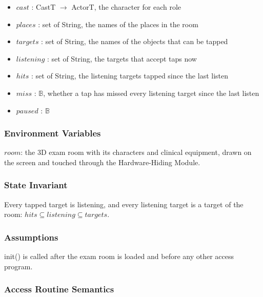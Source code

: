 \documentclass[10pt, titlepage]{article}
\newcommand{\B}{\mathbb{B}}
\newcommand{\T}[1]{\mathit{#1}}          %
\begin{document}
\begin{itemize}
\item $\T{cast}$ : CastT $\to$ ActorT, the character for each role
\item $\T{places}$ : set of String, the names of the places in the room
\item $\T{targets}$ : set of String, the names of the objects that can be
  tapped
\item $\T{listening}$ : set of String, the targets that accept taps now
\item $\T{hits}$ : set of String, the listening targets tapped since the last
  listen
\item $\T{miss}$ : $\B$, whether a tap has missed every listening target since
  the last listen
\item $\T{paused}$ : $\B$
\end{itemize}

\subsubsection{Environment Variables}

$\T{room}$: the 3D exam room with its characters and clinical equipment, drawn
on the screen and touched through the Hardware-Hiding Module.

\subsubsection{State Invariant}

Every tapped target is listening, and every listening target is a target of
the room: $\T{hits} \subseteq \T{listening} \subseteq \T{targets}$.

\subsubsection{Assumptions}

init() is called after the exam room is loaded and before any other access
program.

\subsubsection{Access Routine Semantics}
\end{document}
